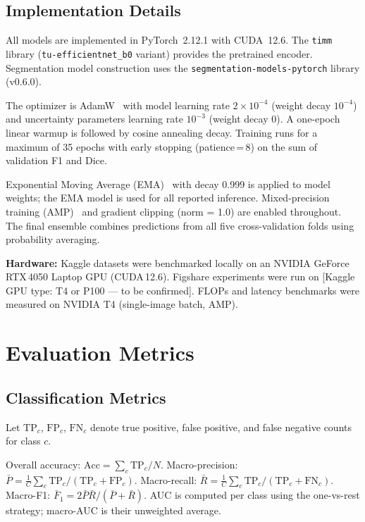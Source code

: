 \documentclass[journal]{IEEEtran}
\begin{document}
\subsection{Implementation Details}
All models are implemented in PyTorch~2.12.1 with CUDA~12.6. The
\texttt{timm} library (\texttt{tu-efficientnet\_b0} variant) provides the
pretrained encoder. Segmentation model construction uses the
\texttt{segmentation-models-pytorch} library (v0.6.0).

The optimizer is AdamW~\cite{loshchilov2019adamw} with model learning rate
$2{\times}10^{-4}$ (weight decay $10^{-4}$) and uncertainty parameters
learning rate $10^{-3}$ (weight decay 0). A one-epoch linear warmup is
followed by cosine annealing decay. Training runs for a maximum of 35 epochs
with early stopping (patience\,=\,8) on the sum of validation F1 and Dice.

Exponential Moving Average (EMA)~\cite{polyak1992ema} with decay 0.999 is
applied to model weights; the EMA model is used for all reported inference.
Mixed-precision training (AMP)~\cite{micikevicius2018amp} and gradient
clipping (norm = 1.0) are enabled throughout. The final ensemble combines
predictions from all five cross-validation folds using probability averaging.

\textbf{Hardware:} Kaggle datasets were benchmarked locally on an
NVIDIA GeForce RTX\,4050 Laptop GPU (CUDA\,12.6). Figshare experiments
were run on [Kaggle GPU type: T4 or P100 — to be confirmed]. FLOPs and
latency benchmarks were measured on NVIDIA T4 (single-image batch, AMP).

\section{Evaluation Metrics}
\label{sec:metrics}

\subsection{Classification Metrics}
Let $\text{TP}_c$, $\text{FP}_c$, $\text{FN}_c$ denote true positive, false
positive, and false negative counts for class $c$.

Overall accuracy: $\text{Acc} = \sum_c \text{TP}_c / N$.
Macro-precision: $\bar{P} = \frac{1}{C}\sum_c \text{TP}_c/(\text{TP}_c+\text{FP}_c)$.
Macro-recall: $\bar{R} = \frac{1}{C}\sum_c \text{TP}_c/(\text{TP}_c+\text{FN}_c)$.
Macro-F1: $\bar{F}_1 = 2\bar{P}\bar{R}/(\bar{P}+\bar{R})$.
AUC is computed per class using the one-vs-rest strategy; macro-AUC is their
unweighted average.
\end{document}
